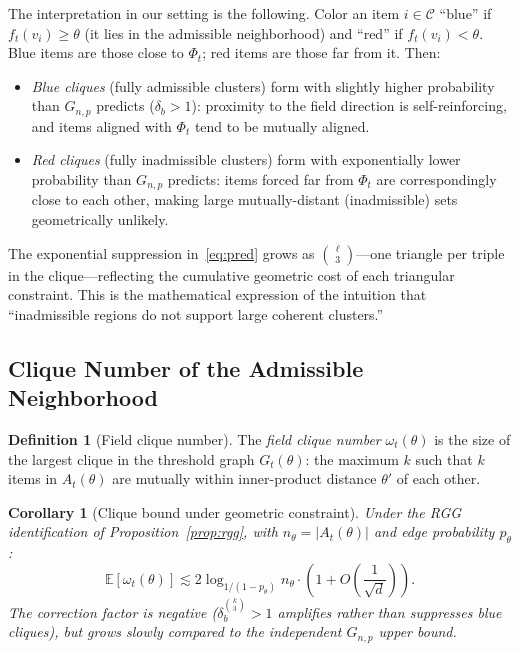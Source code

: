 \documentclass[12pt, a4paper]{article}
\theoremstyle{plain}
\newtheorem{corollary}{Corollary}[section]
\theoremstyle{definition}
\newtheorem{definition}{Definition}[section]
\begin{document}
The interpretation in our setting is the following. Color an item $i \in
\mathcal{C}$ ``blue'' if $f_t(v_i) \ge \theta$ (it lies in the admissible
neighborhood) and ``red'' if $f_t(v_i) < \theta$. Blue items are those close
to $\Phi_t$; red items are those far from it. Then:

\begin{itemize}
  \item \textit{Blue cliques} (fully admissible clusters) form with slightly
    higher probability than $G_{n,p}$ predicts ($\delta_b > 1$): proximity
    to the field direction is self-reinforcing, and items aligned with
    $\Phi_t$ tend to be mutually aligned.
  \item \textit{Red cliques} (fully inadmissible clusters) form with
    exponentially lower probability than $G_{n,p}$ predicts: items forced
    far from $\Phi_t$ are correspondingly close to each other, making large
    mutually-distant (inadmissible) sets geometrically unlikely.
\end{itemize}

The exponential suppression in~\eqref{eq:pred} grows as
$\binom{\ell}{3}$---one triangle per triple in the clique---reflecting the
cumulative geometric cost of each triangular constraint. This is the
mathematical expression of the intuition that ``inadmissible regions do not
support large coherent clusters.''

\subsection{Clique Number of the Admissible Neighborhood}

\begin{definition}[Field clique number]
The \emph{field clique number} $\omega_t(\theta)$ is the size of the
largest clique in the threshold graph $G_t(\theta)$: the maximum $k$ such
that $k$ items in $A_t(\theta)$ are mutually within inner-product distance
$\theta'$ of each other.
\end{definition}

\begin{corollary}[Clique bound under geometric constraint]
\label{cor:clique}
Under the RGG identification of Proposition~\ref{prop:rgg}, with
$n_\theta = |A_t(\theta)|$ and edge probability $p_\theta$:
\begin{equation}
  \mathbb{E}[\omega_t(\theta)] \lesssim
  2\log_{1/(1-p_\theta)} n_\theta
  \cdot \left(1 + O\!\left(\frac{1}{\sqrt{d}}\right)\right).
\end{equation}
The correction factor is negative ($\delta_b^{\binom{k}{3}} > 1$ amplifies
rather than suppresses blue cliques), but grows slowly compared to the
independent $G_{n,p}$ upper bound.
\end{corollary}
\end{document}
